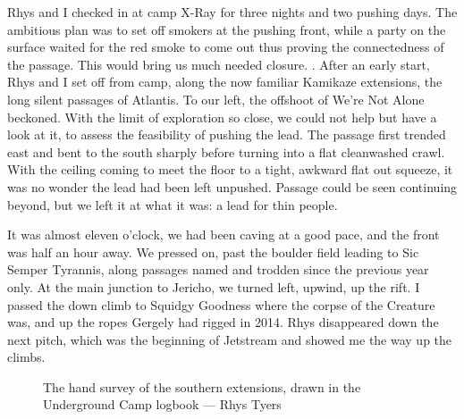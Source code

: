 Rhys and I checked in at camp X-Ray for three nights and two pushing days. The ambitious plan was to set off smokers at the pushing front, while a party on the surface waited for the red smoke to come out thus proving the connectedness of the passage. This would bring us much needed closure.
	. 
After an early start, Rhys and I set off  from camp, along the now familiar Kamikaze extensions, the long silent passages of Atlantis. To our left, the offshoot of We're Not Alone beckoned. With the limit of exploration so close, we could not help but have a look at it, to assess the feasibility of pushing the lead. The passage first trended east and bent to the south sharply before turning into a flat cleanwashed crawl. With the ceiling coming to meet the floor to a tight, awkward flat out squeeze, it was no wonder the lead had been left unpushed. Passage could be seen continuing beyond, but we left it at what it was: a lead for thin people. 

It was almost eleven o'clock, we had been caving at a good pace, and the front was half an hour away. We pressed on, past the boulder field leading to Sic Semper Tyrannis, along passages named and trodden since the previous year only. At the main junction to Jericho, we turned left, upwind, up the rift. I passed the down climb to Squidgy Goodness where the corpse of the Creature was, and up the ropes Gergely had rigged in 2014. Rhys disappeared down the next pitch, which was the beginning of Jetstream and showed me the way up the climbs. 

\begin{figure}[t!]
\checkoddpage \ifoddpage \forcerectofloat \else \forceversofloat \fi
\centering
{}
\caption{The hand survey of the southern extensions, drawn in the Underground Camp logbook --- Rhys Tyers}
\label{Notebook}
\end{figure}

